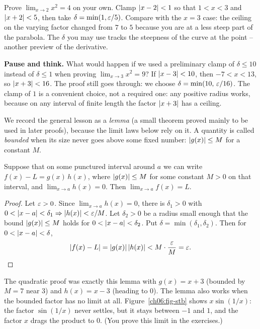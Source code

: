 \begin{labbox}
Prove $\displaystyle\lim_{x\to 2}x^2 = 4$ on your own. Clamp $\lvert x-2\rvert<1$ so
that $1<x<3$ and $\lvert x+2\rvert<5$, then take $\delta=\min(1,\varepsilon/5)$. Compare with
the $x=3$ case: the ceiling on the varying factor changed from $7$ to $5$ because
you are at a less steep part of the parabola. The $\delta$ you may use
tracks the steepness of the curve at the point -- another preview of
the derivative.
\end{labbox}

\begin{recoverybox}
\textbf{Pause and think.} What would happen if we used a preliminary clamp of
$\delta \le 10$ instead of $\delta \le 1$ when proving $\lim_{x\to 3} x^2 = 9$?
If $\lvert x-3\rvert < 10$, then $-7 < x < 13$, so $\lvert x+3\rvert < 16$. The proof
still goes through: we choose $\delta = \min(10,\, \varepsilon/16)$.
The clamp of $1$ is a convenient choice, not a required one: any positive radius
works, because on any interval of finite length the factor $\lvert x+3\rvert$ has a
ceiling.
\end{recoverybox}

We record the general lesson as a \emph{lemma} (a small theorem proved mainly
to be used in later proofs), because the limit laws below rely on it. A
quantity is called \emph{bounded} when its size never goes above some fixed number:
$\lvert g(x)\rvert\le M$ for a constant $M$.

\begin{lemma}
\label{ch06:lem-stb}
Suppose that on some punctured interval around $a$ we can write $f(x)-L =
g(x)\,h(x)$, where $\lvert g(x)\rvert \le M$ for some constant $M>0$ on that interval,
and $\lim_{x\to a} h(x) = 0$. Then $\lim_{x\to a} f(x) = L$.
\end{lemma}

\begin{proof}
Let $\varepsilon>0$. Since $\lim_{x\to a}h(x)=0$, there is $\delta_1>0$ with
$0<\lvert x-a\rvert<\delta_1 \Rightarrow \lvert h(x)\rvert < \varepsilon/M$. Let $\delta_2>0$ be a
radius small enough that the bound $\lvert g(x)\rvert\le M$ holds for
$0<\lvert x-a\rvert<\delta_2$. Put $\delta=\min(\delta_1,\delta_2)$. Then for
$0<\lvert x-a\rvert<\delta$,
\[
  \lvert f(x)-L\rvert = \lvert g(x)\rvert\,\lvert h(x)\rvert < M\cdot\frac{\varepsilon}{M} = \varepsilon. \qedhere
\]
\end{proof}

The quadratic proof was exactly this lemma with $g(x)=x+3$ (bounded by $M=7$ near
$3$) and $h(x)=x-3$ (heading to $0$). The lemma also works when the bounded
factor has no limit at all. Figure~\ref{ch06:fig-stb} shows $x\sin(1/x)$: the
factor $\sin(1/x)$ never settles, but it stays between $-1$ and $1$, and the
factor $x$ drags the product to $0$. (You prove this limit in the exercises.)

